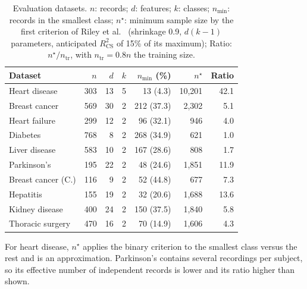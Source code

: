 \documentclass[conference]{IEEEtran}
\begin{document}
\begin{table}[t]
\centering
\caption{Evaluation datasets. $n$: records; $d$: features; $k$: classes; $n_{\min}$: records in the smallest class; $n^{\star}$: minimum sample size by the first criterion of Riley et al.~\cite{riley2019binary} (shrinkage 0.9, $d(k-1)$ parameters, anticipated $R^2_{\mathrm{CS}}$ of 15\% of its maximum); Ratio: $n^{\star}/n_{\mathrm{tr}}$, with $n_{\mathrm{tr}}=0.8n$ the training size.}
\label{tab:datasets}
\footnotesize
\setlength{\tabcolsep}{3pt}
\begin{tabular*}{\columnwidth}{@{\extracolsep{\fill}}lrrrrrr@{}}
\toprule
Dataset & $n$ & $d$ & $k$ & $n_{\min}$ (\%) & $n^{\star}$ & Ratio \\
\midrule
Heart disease & 303 & 13 & 5 & 13 (4.3) & 10,201 & 42.1 \\
Breast cancer & 569 & 30 & 2 & 212 (37.3) & 2,302 & 5.1 \\
Heart failure & 299 & 12 & 2 & 96 (32.1) & 946 & 4.0 \\
Diabetes & 768 & 8 & 2 & 268 (34.9) & 621 & 1.0 \\
Liver disease & 583 & 10 & 2 & 167 (28.6) & 808 & 1.7 \\
Parkinson's & 195 & 22 & 2 & 48 (24.6) & 1,851 & 11.9 \\
Breast cancer (C.) & 116 & 9 & 2 & 52 (44.8) & 677 & 7.3 \\
Hepatitis & 155 & 19 & 2 & 32 (20.6) & 1,688 & 13.6 \\
Kidney disease & 400 & 24 & 2 & 150 (37.5) & 1,840 & 5.8 \\
Thoracic surgery & 470 & 16 & 2 & 70 (14.9) & 1,606 & 4.3 \\
\bottomrule
\end{tabular*}
\par\vspace{2pt}\raggedright\scriptsize For heart disease, $n^{\star}$ applies the binary criterion to the smallest class versus the rest and is an approximation. Parkinson's contains several recordings per subject, so its effective number of independent records is lower and its ratio higher than shown.
\end{table}
\end{document}
